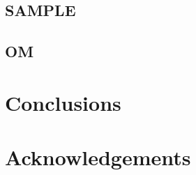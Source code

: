 \documentclass[conference]{IEEEtran}
\begin{document}
\subsection{SAMPLE}
\subsection{OM}


\section{Conclusions}

\section*{Acknowledgements}



\end{document}
